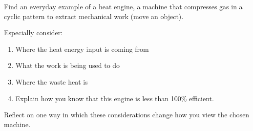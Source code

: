 \documentclass{reflection}
\begin{document}
\maketitle

Find an everyday example of a heat engine, a machine that compresses gas in a cyclic pattern to extract mechanical work (move an object).

Especially consider:
    \begin{enumerate}
        \item Where the heat energy input is coming from
        \item What the work is being used to do
        \item Where the waste heat is
        \item Explain how you know that this engine is less than 100\% efficient.
    \end{enumerate}
Reflect on one way in which these considerations change how you view the chosen machine.

\end{document}

